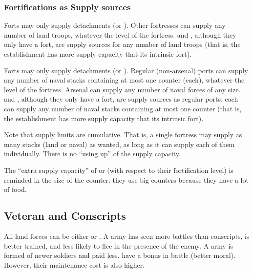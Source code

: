 \subsubsection{Fortifications as Supply sources}
\bparag Forts may only supply detachments (\LD or \LDE).
\bparag Other fortresses can supply any number of land troops, whatever the
level of the fortress.
\bparag \COL and \TP, although they only have a fort, are supply sources for
any number of land troops (that is, the establishment has more supply capacity
that its intrinsic fort).

\bparag Forts may only supply detachments (\ND or \NDE).
\bparag Regular (non-arsenal) ports can supply any number of naval stacks
containing at most one \FLEET counter (each), whatever the level of the
fortress.
\bparag Arsenal can supply any number of naval forces of any size.
\bparag \COL and \TP, although they only have a fort, are supply sources as
regular ports: each can supply any number of naval stacks containing at most
one \FLEET counter (that is, the establishment has more supply capacity that
its intrinsic fort).

\begin{designnote}
  Note that supply limits are cumulative. That is, a single fortress may
  supply as many stacks (land or naval) as wanted, as long as it can supply
  each of them individually. There is no ``using up'' of the supply capacity.

  The ``extra supply capacity'' of \COL or \TP (with respect to their
  fortification level) is reminded in the size of the counter: they use big
  counters because they have a lot of food.
\end{designnote}



\subsection{Veteran and Conscripts}

 All land forces can be either
 or . A  army has seen more
battles than conscripts, is better trained, and less likely to flee in the
presence of the enemy. A  army is formed of newer soldiers
and paid less.
\bparag {} have a bonus in battle (better moral). However, their
maintenance cost is also higher.

